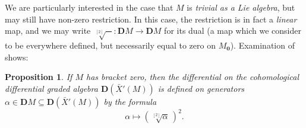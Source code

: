 \documentclass[11pt]{amsart} \renewcommand{\baselinestretch}{1.2}
\theoremstyle{plain}
\newtheorem{prop}[thm]{Proposition}
\theoremstyle{definition}
\newcommand{\DASH}{\mathrm{-}}
\renewcommand{\to}{\longrightarrow}
\newcommand{\citeBOX}[2][]{\cite[\mbox{#1}]{#2}}
\newcommand{\dualrestn}[1]{\sqrt[{[2]}]{#1}}
\renewcommand{\dualrestn}[1]{\sqrt[{\!\!\![2]}]{#1}}
\newcommand{\UEAX}{\bar{X}'}%
\newcommand{\dual}{\mathbf{D}}
\begin{document}
\begin{appendices}
We are particularly  interested in the case that $M$ is \emph{trivial as a Lie algebra}, but may still have non-zero restriction. In this case, the restriction is in fact a \emph{linear} map, and we may write $\dualrestn{\DASH}:\dual M\to \dual M$ for its dual (a map which we consider to be everywhere defined, but necessarily equal to zero on $M_{\textbf{0}}$). Examination of  \citeBOX[(6.19)]{MayRestLie.pdf} shows:
\begin{prop}
\label{CEM for trivial lie bracket}
If $M$ has bracket zero, then the differential on the cohomological differential graded algebra $\dual(\UEAX(M))$ is defined on generators $\alpha\in \dual M\subseteq \dual(\UEAX(M))$ by the formula
\[\alpha\longmapsto (\!\sqrt[{[2]}]{\alpha}\,)^2.\]
\end{prop}
%


\end{appendices}
\end{document}
